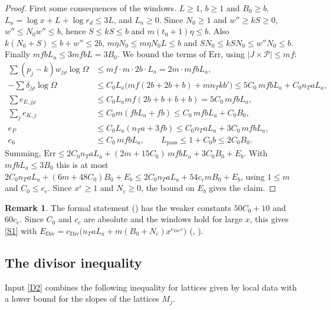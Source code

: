 \documentclass[11pt]{amsart}
\newcommand{\eps}{\varepsilon}
\theoremstyle{plain}
\theoremstyle{definition}
\newtheorem{remark}[theorem]{Remark}
\numberwithin{equation}{section}
\begin{document}
\begin{proof}
First some consequences of the windows. $L\ge1$, $b\ge1$ and $B_0\ge b$. $L_a=\log x+L+\log r_d\le3L$,
and $L_a\ge0$. Since $N_0\ge1$ and $w''\ge kS\ge0$, $w''\le N_0w''\le b$, hence $S\le kS\le b$ and
$m(t_0+1)\eta\le b$. Also $k(N_0+S)\le b+w''\le2b$, $m\eta N_0\le m\eta N_0L\le b$ and $SN_0\le kSN_0\le w''N_0\le b$.
Finally $mfbL_a\le3mfbL=3B_0$. We bound the terms of $\mathrm{Err}$, using $|J\times\mathcal P|\le mf$:
\begin{align*}
\textstyle\sum(p_j-k)w_{j\rho}\log\Omega&\le mf\cdot m\cdot2b\cdot L_a=2m\cdot mfbL_a,\\
\textstyle-\sum\delta_{j\rho}\log\Omega&\le C_0L_a\bigl(mf(2b+2b+b)+mn_Tkb'\bigr)\le5C_0\,mfbL_a+C_0n_TaL_a,\\
\textstyle\sum e_{E,j\rho}&\le C_0L_amf(2b+b+b+b)=5C_0\,mfbL_a,\\
\textstyle\sum_je_{K,j}&\le C_0m(fbL_a+fb)\le C_0\,mfbL_a+C_0B_0,\\
e_P&\le C_0L_a(n_Ta+3fb)\le C_0n_TaL_a+3C_0\,mfbL_a,\\
e_6&\le C_0\,mfbL_a,\qquad L_{\mathrm{pass}}\le1+C_0b\le2C_0B_0.
\end{align*}
Summing, $\mathrm{Err}\le2C_0n_TaL_a+(2m+15C_0)\,mfbL_a+3C_0B_0+E_b$. With $mfbL_a\le3B_0$ this is at
most $2C_0n_TaL_a+(6m+48C_0)B_0+E_b\le2C_0n_TaL_a+54c_emB_0+E_b$, using $1\le m$ and $C_0\le c_e$.
Since $x^\eps\ge1$ and $N_c\ge0$, the bound on $E_b$ gives the claim.
\end{proof}

\begin{remark}
The formal statement () has the weaker constants $50C_0+10$ and $60c_e$. Since
$C_0$ and $c_e$ are absolute and the windows hold for large $x$, this gives \ref{S1} with
$E_{\mathrm{Div}}=c_{\mathrm{Div}}\bigl(n_TaL_a+m(B_0+N_c)x^{e_{\mathrm{Div}}\eps}\bigr)$
(, ).
\end{remark}

\subsection{The divisor inequality}

Input \ref{D2} combines the following inequality for lattices given by local data with a lower
bound for the slopes of the lattices $M_j$.
\end{document}
